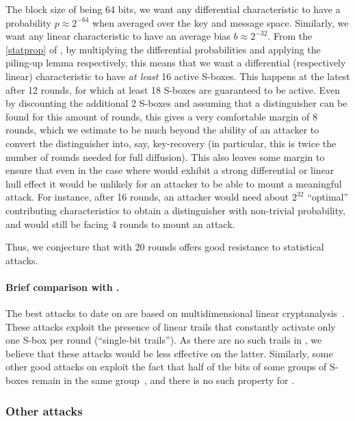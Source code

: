 The block size of \fly being 64 bits, we want any differential characteristic to have a probability $p \approx 2^{-64}$ when averaged over the key and
message space. Similarly, we want any linear characteristic to have an average bias $b \approx 2^{-32}$. From
the \autoref{statprop} of \littlunOne, by multiplying the differential probabilities and applying the piling-up lemma respectively, this means that we want a differential
(respectively linear) characteristic to have \emph{at least} 16 active S-boxes. This happens at the latest after 12 rounds, for which at least 18 S-boxes are guaranteed to be active.
Even by discounting the additional 2 S-boxes and assuming that a distinguisher can be found for this amount of rounds, this gives a very comfortable margin of 8 rounds,
which we estimate to be much beyond the ability of an attacker to convert the distinguisher into, say, key-recovery (in particular, this is twice the number of rounds needed
for full diffusion).
This also leaves some margin to ensure that even in the case where \fly would exhibit a strong differential or linear hull effect it would be unlikely for an attacker to be able
to mount a meaningful attack. For instance, after 16 rounds, an attacker would need about $2^{32}$ ``optimal'' contributing characteristics to obtain a distinguisher with non-trivial
probability, and would still be facing 4 rounds to mount an attack.

Thus, we conjecture that \fly with 20 rounds offers good resistance to statistical attacks.

\paragraph{Brief comparison with \present.}
The best attacks to date on \present are based on multidimensional linear cryptanalysis~\cite{DBLP:conf/ctrsa/Cho10,DBLP:journals/iacr/BogdanovTV16}. These attacks exploit the presence of linear trails
that constantly activate only one S-box per round (\ie ``single-bit trails''). As there are no such trails in \fly, we believe that these attacks would be less effective
on the latter. Similarly, some other good attacks on \present exploit the fact that half of the bits of some groups of S-boxes remain in the same group~\cite{DBLP:conf/ctrsa/CollardS09},
and there is no such property for \fly.

\subsubsection{Other attacks}

